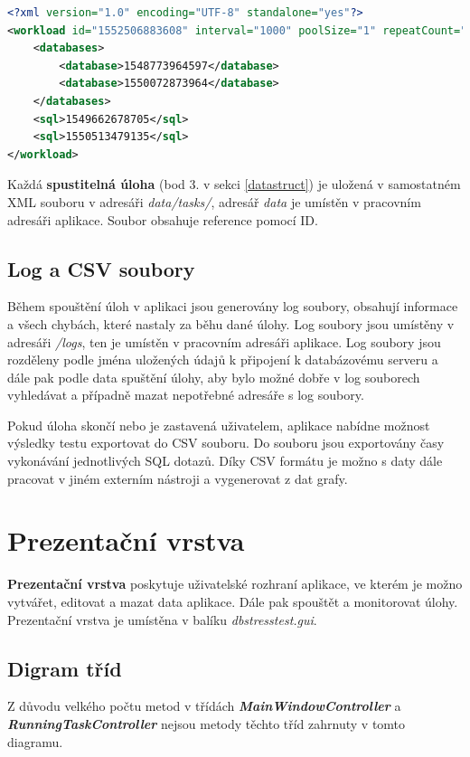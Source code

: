 \documentclass[czech,bachelor,public,dept460,male,cpdeclaration,twoside]{diploma}
\begin{document}
\begin{minipage}{\linewidth}
\begin{lstlisting}[caption=Spustitelná úloha ve formátu XML\label{lst:task},language=XML] 
<?xml version="1.0" encoding="UTF-8" standalone="yes"?>
<workload id="1552506883608" interval="1000" poolSize="1" repeatCount="-1" taskName="SuperTest">
    <databases>
        <database>1548773964597</database>
        <database>1550072873964</database>
    </databases>
    <sql>1549662678705</sql>
    <sql>1550513479135</sql>
</workload>
\end{lstlisting}
Každá \textbf{spustitelná úloha} (bod 3. v sekci \ref{datastruct}) je uložená v samostatném XML souboru v adresáři \textit{data/tasks/}, adresář \textit{data} je umístěn v pracovním adresáři aplikace. Soubor obsahuje reference pomocí ID.
\end{minipage}

\subsection{Log a CSV soubory} \label{logs}
Během spouštění úloh v aplikaci jsou generovány log soubory, obsahují informace a všech chybách, které nastaly za běhu dané úlohy. Log soubory jsou umístěny v adresáři \textit{/logs}, ten je umístěn v pracovním adresáři aplikace. Log soubory jsou rozděleny podle jména uložených údajů k připojení k databázovému serveru a dále pak podle data spuštění úlohy, aby bylo možné dobře v log souborech vyhledávat a případně mazat nepotřebné adresáře s log soubory.

Pokud úloha skončí nebo je zastavená uživatelem, aplikace nabídne možnost výsledky testu exportovat do CSV souboru. Do souboru jsou exportovány časy vykonávání jednotlivých SQL dotazů. Díky CSV formátu je možno s daty dále pracovat v jiném externím nástroji a vygenerovat z dat grafy.

\section{Prezentační vrstva} \label{presentlayer}
\textbf{Prezentační vrstva} poskytuje uživatelské rozhraní aplikace, ve kterém je možno vytvářet, editovat a mazat data aplikace. Dále pak spouštět a monitorovat úlohy. Prezentační vrstva je umístěna v balíku \textit{dbstresstest.gui}.
\subsection{Digram tříd} \label{prezent}
Z důvodu velkého počtu metod v třídách \textbf{\emph{MainWindowController}} a \textbf{\emph{RunningTaskController}} nejsou metody těchto tříd zahrnuty v tomto diagramu.
\end{document}
